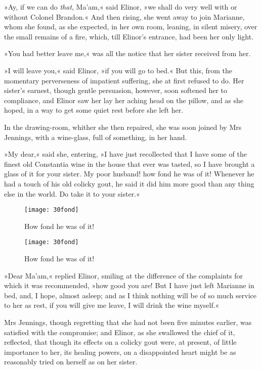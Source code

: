 »Ay, if we can do \textit{that}, Ma’am,« said Elinor, »we shall do very well with or without Colonel Brandon.« And then rising, she went away to join Marianne, whom she found, as she expected, in her own room, leaning, in silent misery, over the small remains of a fire, which, till Elinor’s entrance, had been her only light.

»You had better leave me,« was all the notice that her sister received from her.

»I will leave you,« said Elinor, »if you will go to bed.« But this, from the momentary perverseness of impatient suffering, she at first refused to do. Her sister’s earnest, though gentle persuasion, however, soon softened her to compliance, and Elinor saw her lay her aching head on the pillow, and as she hoped, in a way to get some quiet rest before she left her.

In the drawing-room, whither she then repaired, she was soon joined by Mrs Jennings, with a wine-glass, full of something, in her hand.

»My dear,« said she, entering, »I have just recollected that I have some of the finest old Constantia wine in the house that ever was tasted, so I have brought a glass of it for your sister. My poor husband! how fond he was of it! Whenever he had a touch of his old colicky gout, he said it did him more good than any thing else in the world. Do take it to your sister.«


\begin{a4}
	\begin{figure}[tbph]
		\centering
		\texttt{[image: 30fond]}
		\caption{How fond he was of it!}
	\end{figure}
\end{a4}

\begin{letter}
	\begin{figure}[tbph]
		\centering
		\texttt{[image: 30fond]}
		\caption{How fond he was of it!}
	\end{figure}
\end{letter}



»Dear Ma’am,« replied Elinor, smiling at the difference of the complaints for which it was recommended, »how good you are! But I have just left Marianne in bed, and, I hope, almost asleep; and as I think nothing will be of so much service to her as rest, if you will give me leave, I will drink the wine myself.«

Mrs Jennings, though regretting that she had not been five minutes earlier, was satisfied with the compromise; and Elinor, as she swallowed the chief of it, reflected, that though its effects on a colicky gout were, at present, of little importance to her, its healing powers, on a disappointed heart might be as reasonably tried on herself as on her sister.

